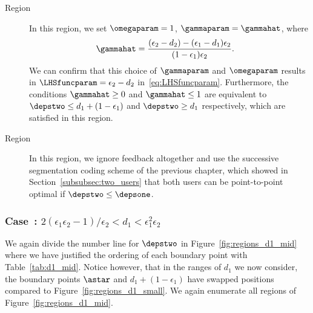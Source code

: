 \begin{description}
	\item[Region~]  In this region, we set $\omegaparam= 1$, $\gammaparam = \gammahat$, where
		\begin{align}
			\gammahat &= \frac{(\epsilon_2 - d_2) - (\epsilon_1 - d_1)\epsilon_2}{(1 - \epsilon_1)\epsilon_2}.
			\label{eq:gammahat}
		\end{align}
		We can confirm that this choice of $\gammaparam$ and $\omegaparam$ results in $\LHSfuncparam = \epsilon_2 - d_2$ in~\eqref{eq:LHSfuncparam}.  Furthermore, the conditions $\gammahat \geq 0$ and $\gammahat \leq 1$ are equivalent to $\depstwo \leq d_1 + (1 - \epsilon_1)$ and $\depstwo \geq d_1$ respectively, which are satisfied in this region.%
	
	\item[Region~]  In this region, we ignore feedback altogether and use the successive segmentation coding scheme of the previous chapter, which showed in Section~\ref{subsubsec:two_users} that both users can be point-to-point optimal if $\depstwo \leq \depsone$.
\end{description}



\subsubsection{Case~: $2(\epsilon_1\epsilon_2 - 1)/\epsilon_2 < d_1 < \epsilon_1^2\epsilon_2$}

We again divide the number line for $\depstwo$ in Figure~\ref{fig:regions_d1_mid} where we have justified the ordering of each boundary point with Table~\ref{tab:d1_mid}.  Notice however, that in the ranges of $d_1$ we now consider, the boundary points $\astar$ and $d_1 + (1 - \epsilon_1)$ have swapped positions compared to Figure~\ref{fig:regions_d1_small}.  We again enumerate all regions of Figure~\ref{fig:regions_d1_mid}.

